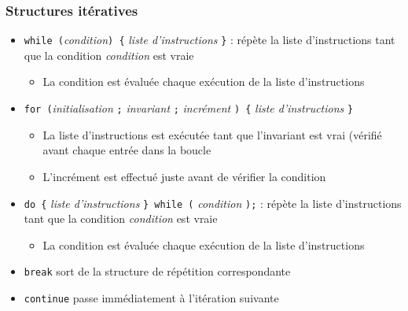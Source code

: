 \begin{frame}[fragile]
\frametitle{Structures itératives}
\begin{itemize}
\item \verb|while (|\textit{condition}\verb|) {| \textit{liste d'instructions} \verb|}| : répète la liste d'instructions tant que la condition \textit{condition} est vraie
\begin{itemize}
\item La condition est évaluée  chaque exécution de la liste d'instructions
\end{itemize}
\item \verb|for (|\textit{initialisation} \verb|;| \textit{invariant} \verb|;| \textit{incrément} \verb|) {| \textit{liste d'instructions} \verb|}|
\begin{itemize}
\item La liste d'instructions est exécutée tant que l'invariant est vrai (vérifié avant chaque entrée dans la boucle
\item L'incrément est effectué juste avant de vérifier la condition
\end{itemize}
\item \verb|do {| \textit{liste d'instructions} \verb|} while (| \textit{condition} \verb|);|  : répète la liste d'instructions tant que la condition \textit{condition} est vraie
\begin{itemize}
\item La condition est évaluée  chaque exécution de la liste d'instructions
\end{itemize}
\item \verb|break| sort de la structure de répétition correspondante
\item \verb|continue| passe immédiatement à l'itération suivante
\end{itemize}
\end{frame}

